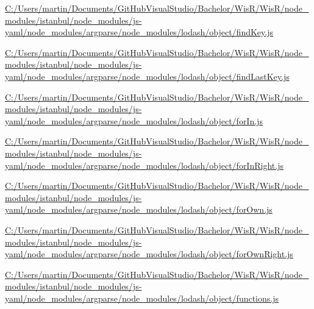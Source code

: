 \begin{DoxyCompactItemize}
\item 
\hyperlink{_c_1_2_users_2martin_2_documents_2_git_hub_visual_studio_2_bachelor_2_wis_r_2_wis_r_2node_moduleb8185989c62712b493bc5b9679a07fd8}{C\+:/\+Users/martin/\+Documents/\+Git\+Hub\+Visual\+Studio/\+Bachelor/\+Wis\+R/\+Wis\+R/node\+\_\+modules/istanbul/node\+\_\+modules/js-\/yaml/node\+\_\+modules/argparse/node\+\_\+modules/lodash/object/find\+Key.\+js}
\item 
\hyperlink{_c_1_2_users_2martin_2_documents_2_git_hub_visual_studio_2_bachelor_2_wis_r_2_wis_r_2node_module4c9b6f53f20d43fd2aa368070db0393a}{C\+:/\+Users/martin/\+Documents/\+Git\+Hub\+Visual\+Studio/\+Bachelor/\+Wis\+R/\+Wis\+R/node\+\_\+modules/istanbul/node\+\_\+modules/js-\/yaml/node\+\_\+modules/argparse/node\+\_\+modules/lodash/object/find\+Last\+Key.\+js}
\item 
\hyperlink{_c_1_2_users_2martin_2_documents_2_git_hub_visual_studio_2_bachelor_2_wis_r_2_wis_r_2node_module9ffc97169f0a15e2134f146445cd7404}{C\+:/\+Users/martin/\+Documents/\+Git\+Hub\+Visual\+Studio/\+Bachelor/\+Wis\+R/\+Wis\+R/node\+\_\+modules/istanbul/node\+\_\+modules/js-\/yaml/node\+\_\+modules/argparse/node\+\_\+modules/lodash/object/for\+In.\+js}
\item 
\hyperlink{_c_1_2_users_2martin_2_documents_2_git_hub_visual_studio_2_bachelor_2_wis_r_2_wis_r_2node_module91d7f4e0e50fec978a94100462d29b29}{C\+:/\+Users/martin/\+Documents/\+Git\+Hub\+Visual\+Studio/\+Bachelor/\+Wis\+R/\+Wis\+R/node\+\_\+modules/istanbul/node\+\_\+modules/js-\/yaml/node\+\_\+modules/argparse/node\+\_\+modules/lodash/object/for\+In\+Right.\+js}
\item 
\hyperlink{_c_1_2_users_2martin_2_documents_2_git_hub_visual_studio_2_bachelor_2_wis_r_2_wis_r_2node_modulefac57bd202ef6c04e1b1569c458e639b}{C\+:/\+Users/martin/\+Documents/\+Git\+Hub\+Visual\+Studio/\+Bachelor/\+Wis\+R/\+Wis\+R/node\+\_\+modules/istanbul/node\+\_\+modules/js-\/yaml/node\+\_\+modules/argparse/node\+\_\+modules/lodash/object/for\+Own.\+js}
\item 
\hyperlink{_c_1_2_users_2martin_2_documents_2_git_hub_visual_studio_2_bachelor_2_wis_r_2_wis_r_2node_module4ece162061f12ae26da3fefeda1fa450}{C\+:/\+Users/martin/\+Documents/\+Git\+Hub\+Visual\+Studio/\+Bachelor/\+Wis\+R/\+Wis\+R/node\+\_\+modules/istanbul/node\+\_\+modules/js-\/yaml/node\+\_\+modules/argparse/node\+\_\+modules/lodash/object/for\+Own\+Right.\+js}
\item 
\hyperlink{_c_1_2_users_2martin_2_documents_2_git_hub_visual_studio_2_bachelor_2_wis_r_2_wis_r_2node_module13877813c0f93181d6335d6b41fe60ce}{C\+:/\+Users/martin/\+Documents/\+Git\+Hub\+Visual\+Studio/\+Bachelor/\+Wis\+R/\+Wis\+R/node\+\_\+modules/istanbul/node\+\_\+modules/js-\/yaml/node\+\_\+modules/argparse/node\+\_\+modules/lodash/object/functions.\+js}

\end{DoxyCompactItemize}
